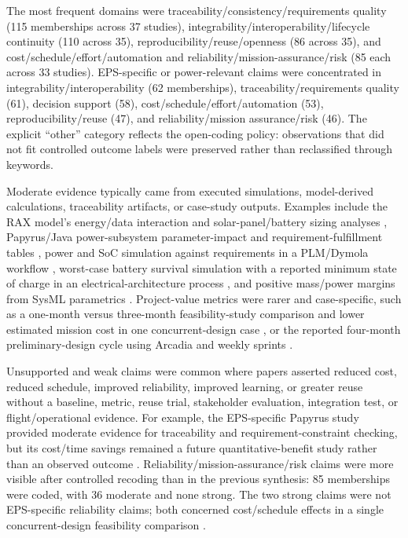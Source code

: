 The most frequent domains were traceability/consistency/requirements quality (115 memberships across 37 studies), integrability/interoperability/lifecycle continuity (110 across 35), reproducibility/reuse/openness (86 across 35), and cost/schedule/effort/automation and reliability/mission-assurance/risk (85 each across 33 studies).  EPS-specific or power-relevant claims were concentrated in integrability/interoperability (62 memberships), traceability/requirements quality (61), decision support (58), cost/schedule/effort/automation (53), reproducibility/reuse (47), and reliability/mission assurance/risk (46).  The explicit ``other'' category reflects the open-coding policy: observations that did not fit controlled outcome labels were preserved rather than reclassified through keywords.

Moderate evidence typically came from executed simulations, model-derived calculations, traceability artifacts, or case-study outputs.  Examples include the RAX model's energy/data interaction and solar-panel/battery sizing analyses \cite{paper-0001,paper-0003}, Papyrus/Java power-subsystem parameter-impact and requirement-fulfillment tables \cite{paper-0026}, power and SoC simulation against requirements in a PLM/Dymola workflow \cite{paper-0059}, worst-case battery survival simulation with a reported minimum state of charge in an electrical-architecture process \cite{paper-0053}, and positive mass/power margins from SysML parametrics \cite{paper-0080}.  Project-value metrics were rarer and case-specific, such as a one-month versus three-month feasibility-study comparison and lower estimated mission cost in one concurrent-design case \cite{paper-0061}, or the reported four-month preliminary-design cycle using Arcadia and weekly sprints \cite{paper-0078}.

Unsupported and weak claims were common where papers asserted reduced cost, reduced schedule, improved reliability, improved learning, or greater reuse without a baseline, metric, reuse trial, stakeholder evaluation, integration test, or flight/operational evidence.  For example, the EPS-specific Papyrus study provided moderate evidence for traceability and requirement-constraint checking, but its cost/time savings remained a future quantitative-benefit study rather than an observed outcome \cite{paper-0026}.  Reliability/mission-assurance/risk claims were more visible after controlled recoding than in the previous synthesis: 85 memberships were coded, with 36 moderate and none strong.  The two strong claims were not EPS-specific reliability claims; both concerned cost/schedule effects in a single concurrent-design feasibility comparison \cite{paper-0061}.

